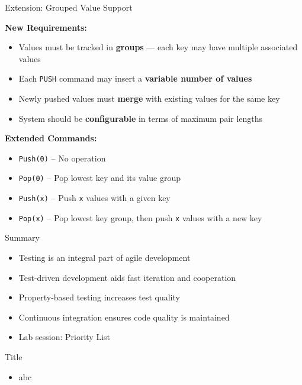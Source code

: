 \begin{frame}{Extension: Grouped Value Support}
	
	\textbf{New Requirements:}
	\begin{itemize}
		\item Values must be tracked in \textbf{groups} --- each key may have multiple associated values
		\item Each \texttt{PUSH} command may insert a \textbf{variable number of values}
		\item Newly pushed values must \textbf{merge} with existing values for the same key
		\item System should be \textbf{configurable} in terms of maximum pair lengths
	\end{itemize}
	
	\vspace{0.5em}
	\textbf{Extended Commands:}
	\begin{itemize}
		\item \texttt{Push(0)} -- No operation
		\item \texttt{Pop(0)} -- Pop lowest key and its value group
		\item \texttt{Push(x)} -- Push \texttt{x} values with a given key
		\item \texttt{Pop(x)} -- Pop lowest key group, then push \texttt{x} values with a new key
	\end{itemize}
	
\end{frame}

\begin{frame}{Summary}
	\begin{itemize}
		\item Testing is an integral part of agile development
		\item Test-driven development aids fast iteration and cooperation
		\item Property-based testing increases test quality
		\item Continuous integration ensures code quality is maintained
		\item Lab session: Priority List
	\end{itemize}
\end{frame}



\begin{frame}[fragile]{Title}
\begin{itemize}
\item abc
\end{itemize}
\end{frame}

